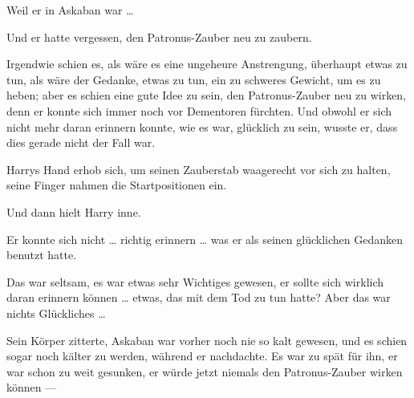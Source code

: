 Weil er in Askaban war …

Und er hatte vergessen, den Patronus-Zauber neu zu zaubern.

Irgendwie schien es, als wäre es eine ungeheure Anstrengung, überhaupt etwas zu tun, als wäre der Gedanke, etwas zu tun, ein zu schweres Gewicht, um es zu heben; aber es schien eine gute Idee zu sein, den Patronus-Zauber neu zu wirken, denn er konnte sich immer noch vor Dementoren fürchten. Und obwohl er sich nicht mehr daran erinnern konnte, wie es war, glücklich zu sein, wusste er, dass dies gerade nicht der Fall war.

Harrys Hand erhob sich, um seinen Zauberstab waagerecht vor sich zu halten, seine Finger nahmen die Startpositionen ein.

Und dann hielt Harry inne.

Er konnte sich nicht … richtig erinnern … was er als seinen glücklichen Gedanken benutzt hatte.

Das war seltsam, es war etwas sehr Wichtiges gewesen, er sollte sich wirklich daran erinnern können … etwas, das mit dem Tod zu tun hatte? Aber das war nichts Glückliches …

Sein Körper zitterte, Askaban war vorher noch nie so kalt gewesen, und es schien sogar noch kälter zu werden, während er nachdachte. Es war zu spät für ihn, er war schon zu weit gesunken, er würde jetzt niemals den Patronus-Zauber wirken können —

